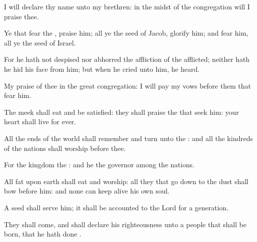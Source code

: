 {\Q {}I will
declare thy
name unto my
brethren: in the
midst of the
congregation will I
praise thee.


\par }{\Q {}Ye that
fear the
{},
praise him; all ye the
seed of
Jacob,
glorify him; and
fear him, all ye the
seed of
Israel.


\par }{\Q {}For he hath not
despised nor
abhorred the
affliction of the
afflicted; neither hath he
hid his
face from him; but when he
cried unto him, he
heard.


\par }{\Q {}My
praise
{} of thee in the
great
congregation: I will
pay my
vows before them that
fear him.


\par }{\Q {}The
meek shall
eat and be
satisfied: they shall
praise the
{} that
seek him: your
heart shall
live for
ever.


\par }{\Q {}All the
ends of the
world shall
remember and
turn unto the
{}: and all the
kindreds of the
nations shall
worship
before thee.


\par }{\Q {}For the
kingdom
{} the
{}: and he
{} the
governor among the
nations.


\par }{\Q {}All
{}
fat upon
earth shall
eat and
worship: all they that go
down to the
dust shall
bow
before him: and none can keep
alive his own
soul.


\par }{\Q {}A
seed shall
serve him; it shall be
accounted to the
Lord for a
generation.


\par }{\Q {}They shall
come, and shall
declare his
righteousness unto a
people that shall be
born, that he hath
done
{}.




\par }
